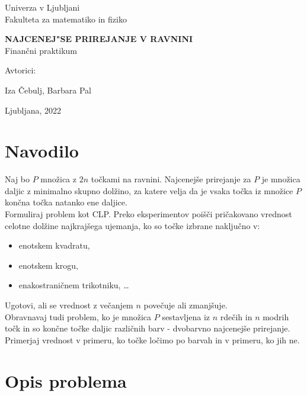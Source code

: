 \documentclass[a4paper, 11pt]{article}
\begin{document}
\thispagestyle{empty}
\begin{center}
\begin{minipage}{0.75\linewidth}
    \centering
    {\Large Univerza v Ljubljani \\ Fakulteta za matematiko in fiziko}
    \\
    \vspace{7cm}

    {\uppercase{\Large \textbf{Najcenej"se prirejanje v ravnini}}} \\ Finančni praktikum \\
    \vspace{3cm}

    Avtorici:\\
    {\Large Iza Čebulj, Barbara Pal\par}
    \vspace{7cm}

    {\Large Ljubljana, 2022}
\end{minipage}
\end{center}

\newpage
 
\section{Navodilo}

Naj bo $P$ množica z $2n$ točkami na ravnini. Najcenejše prirejanje za $P$ je množica daljic z minimalno skupno dolžino, za katere velja da je vsaka točka iz množice $P$ končna točka natanko ene daljice. \\
Formuliraj problem kot CLP. Preko eksperimentov poišči pričakovano vrednost celotne dolžine najkrajšega ujemanja, ko so točke izbrane naključno v:
\begin{itemize}
    \item enotskem kvadratu,
    \item enotskem krogu,
    \item enakostraničnem trikotniku, \dots
\end{itemize}
Ugotovi, ali se vrednost z večanjem $n$ povečuje ali zmanjšuje. \\
Obravnavaj tudi problem, ko je množica $P$ sestavljena iz $n$ rdečih in $n$ modrih točk in so končne točke daljic različnih barv - dvobarvno najcenejše prirejanje. 
Primerjaj vrednost v primeru, ko točke ločimo po barvah in v primeru, ko jih ne.  

\section{Opis problema}
\end{document}
